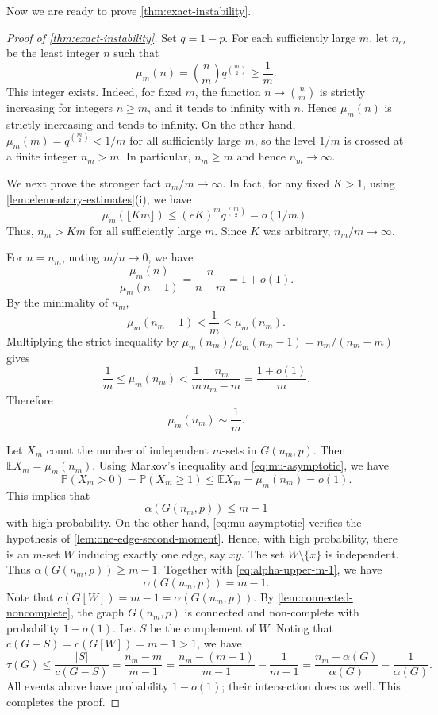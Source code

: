 \documentclass[11pt,reqno]{amsart}
\theoremstyle{definition}
\theoremstyle{remark}
\newcommand{\EE}{\mathbb E}
\newcommand{\PP}{\mathbb P}
\begin{document}
Now we are ready to prove \cref{thm:exact-instability}.

\begin{proof}[Proof of \cref{thm:exact-instability}]
\smallskip
Set $q=1-p$. For each sufficiently large $m$, let $n_m$ be the least integer $n$ such that
\begin{equation}\label{eq:nm-definition}
 \mu_m(n)=\binom nmq^{\binom m2}\ge\frac1m.
\end{equation}
This integer exists.  Indeed, for fixed $m$, the function
$n\mapsto\binom nm$ is strictly increasing for integers $n\ge m$, and it
tends to infinity with $n$.  Hence $\mu_m(n)$ is strictly increasing and
tends to infinity.  On the other hand,
$\mu_m(m)=q^{\binom m2}<1/m$ for all sufficiently large $m$, so the level
$1/m$ is crossed at a finite integer $n_m>m$.  In particular,
$n_m\ge m$ and hence $n_m\to\infty$.

We next prove the stronger fact $n_m/m\to\infty$. In fact, for any fixed $K>1$,
using
\cref{lem:elementary-estimates}(i), we have 
\[
 \mu_m(\lfloor Km\rfloor)
 \le (eK)^m q^{\binom m2}=o(1/m).
\]
Thus, $n_m>Km$ for all sufficiently large
$m$.  Since $K$ was arbitrary, $n_m/m\to\infty$.

For $n=n_m$, noting $m/n\to0$, we have
\[
 \frac{\mu_m(n)}{\mu_m(n-1)}=\frac{n}{n-m}=1+o(1).
\]
 By the minimality of $n_m$,
\[
 \mu_m(n_m-1)<\frac1m\le\mu_m(n_m).
\]
Multiplying the strict inequality by
$\mu_m(n_m)/\mu_m(n_m-1)=n_m/(n_m-m)$ gives
\[
 \frac1m\le\mu_m(n_m)
 <\frac1m\frac{n_m}{n_m-m}
 =\frac{1+o(1)}m.
\]
Therefore
\begin{equation}\label{eq:mu-asymptotic}
 \mu_m(n_m)\sim\frac1m.
\end{equation}

\smallskip

Let $X_m$ count the number of independent $m$-sets in $G(n_m,p)$. Then $\EE X_m=\mu_m(n_m)$.  Using Markov's inequality and \eqref{eq:mu-asymptotic}, we have
\[
 \PP(X_m>0)=\PP(X_m\geq1)\le\EE X_m=\mu_m(n_m)=o(1).
\]
This implies that 
\begin{equation}\label{eq:alpha-upper-m-1}
 \alpha(G(n_m,p))\le m-1
\end{equation}
with high probability. On the other hand, \eqref{eq:mu-asymptotic} verifies the hypothesis of
\cref{lem:one-edge-second-moment}.  Hence, with high probability, there is an
$m$-set $W$ inducing exactly one edge, say $xy$.  The set
$W\setminus\{x\}$ is independent. Thus $\alpha(G(n_m,p))\geq m-1$.  Together with
\eqref{eq:alpha-upper-m-1}, we have
\[
 \alpha(G(n_m,p))= m-1.
\]
Note that
$
 c(G[W])=m-1=\alpha(G(n_m,p)).
$
By \cref{lem:connected-noncomplete}, the graph $G(n_m,p)$ is connected and
non-complete with probability $1-o(1)$. Let $S$ be the complement of $W$. Noting that $c(G-S)=c(G[W])=m-1>1$, we have 
\[
 \tau(G)
 \le\frac{|S|}{c(G-S)}
 =\frac{n_m-m}{m-1}
 =\frac{n_m-(m-1)}{m-1}-\frac1{m-1}
 =\frac{n_m-\alpha(G)}{\alpha(G)}-\frac{1}{\alpha(G)}.
\]
All events above have probability $1-o(1)$; their intersection does as
well.  This completes the proof.
\end{proof}
\end{document}
